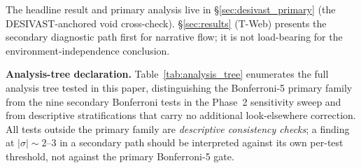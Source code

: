 \documentclass[aps,prd,twocolumn,superscriptaddress,showpacs,preprintnumbers,nofootinbib,longbibliography,floatfix]{revtex4-2}
\begin{document}
The headline result and primary analysis live
in \S\ref{sec:desivast_primary} (the DESIVAST-anchored void cross-check).
\S\ref{sec:results} (T-Web) presents the secondary diagnostic path first
for narrative flow; it is not load-bearing for the environment-independence
conclusion.
\fi

\textbf{Analysis-tree declaration.}
Table~\ref{tab:analysis_tree} enumerates the full analysis tree tested
in this paper, distinguishing the Bonferroni-5 primary family from the
nine secondary Bonferroni tests in the Phase~2 sensitivity sweep and
from descriptive stratifications that carry no additional look-elsewhere
correction. All tests outside the primary family are \emph{descriptive
consistency checks}; a finding at $|\sigma| \sim 2$--$3$ in a
secondary path should be interpreted against its own per-test threshold,
not against the primary Bonferroni-5 gate.
\end{document}
